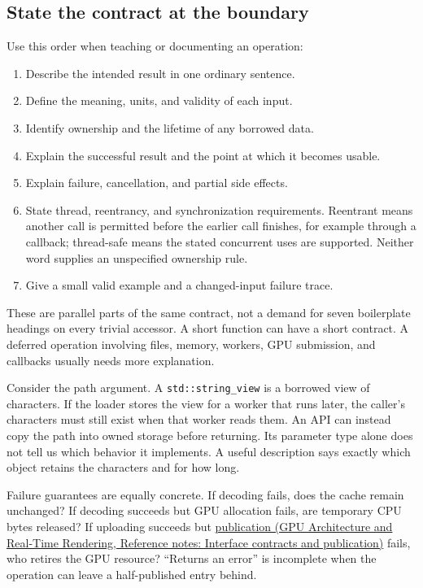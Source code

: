 \subsection{State the contract at the boundary}\label{05-engine-i-ch008-state-the-contract-at-the-boundary}

Use this order when teaching or documenting an operation:

\begin{enumerate}
\def\labelenumi{\arabic{enumi}.}
\tightlist
\item
  Describe the intended result in one ordinary sentence.
\item
  Define the meaning, units, and validity of each input.
\item
  Identify ownership and the lifetime of any borrowed data.
\item
  Explain the successful result and the point at which it becomes usable.
\item
  Explain failure, cancellation, and partial side effects.
\item
  State thread, reentrancy, and synchronization requirements. Reentrant means another call is permitted before the earlier call finishes, for example through a callback; thread-safe means the stated concurrent uses are supported. Neither word supplies an unspecified ownership rule.
\item
  Give a small valid example and a changed-input failure trace.
\end{enumerate}

These are parallel parts of the same contract, not a demand for seven boilerplate headings on every trivial accessor. A short function can have a short contract. A deferred operation involving files, memory, workers, GPU submission, and callbacks usually needs more explanation.

Consider the path argument. A \texttt{std::string\_view} is a borrowed view of characters. If the loader stores the view for a worker that runs later, the caller's characters must still exist when that worker reads them. An API can instead copy the path into owned storage before returning. Its parameter type alone does not tell us which behavior it implements. A useful description says exactly which object retains the characters and for how long.

Failure guarantees are equally concrete. If decoding fails, does the cache remain unchanged? If decoding succeeds but GPU allocation fails, are temporary CPU bytes released? If uploading succeeds but \href{../06-GPU-Architecture-and-Real-Time-Rendering/main.pdf\#nameddest=appendix-fdae7ff0a23f}{publication (GPU Architecture and Real-Time Rendering, Reference notes: Interface contracts and publication)} fails, who retires the GPU resource? ``Returns an error'' is incomplete when the operation can leave a half-published entry behind.


